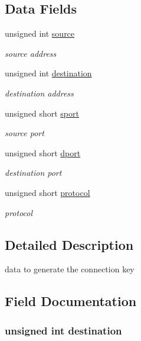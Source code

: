 \subsection*{Data Fields}
\begin{DoxyCompactItemize}
\item 
unsigned int \hyperlink{structntoh__tcp__tuple5__t_a32ee136f9a3309d9f5aec70ddaebc420}{source}
\begin{DoxyCompactList}\small\item\em source address \end{DoxyCompactList}\item 
unsigned int \hyperlink{structntoh__tcp__tuple5__t_aa2b73075fb6a7866116ece24e01ea950}{destination}
\begin{DoxyCompactList}\small\item\em destination address \end{DoxyCompactList}\item 
unsigned short \hyperlink{structntoh__tcp__tuple5__t_a7122c66c4668cd4ee36485bd9009ca6d}{sport}
\begin{DoxyCompactList}\small\item\em source port \end{DoxyCompactList}\item 
unsigned short \hyperlink{structntoh__tcp__tuple5__t_a1fdc28da1e85b5968e0ce83dcb106287}{dport}
\begin{DoxyCompactList}\small\item\em destination port \end{DoxyCompactList}\item 
unsigned short \hyperlink{structntoh__tcp__tuple5__t_ac61644f2747d106fe73d2aba4384a2ba}{protocol}
\begin{DoxyCompactList}\small\item\em protocol \end{DoxyCompactList}\end{DoxyCompactItemize}


\subsection{Detailed Description}
data to generate the connection key 

\subsection{Field Documentation}
\hypertarget{structntoh__tcp__tuple5__t_aa2b73075fb6a7866116ece24e01ea950}{
\subsubsection[{destination}]{\setlength{\rightskip}{0pt plus 5cm}unsigned int destination}}\label{structntoh__tcp__tuple5__t_aa2b73075fb6a7866116ece24e01ea950}


